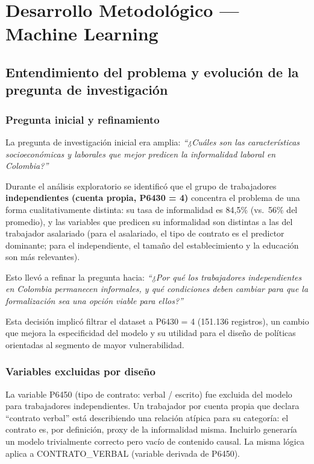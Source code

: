 \documentclass[12pt, a4paper]{article}
\begin{document}
\section{Desarrollo Metodológico — Machine Learning}
\label{sec:ml}

\subsection{Entendimiento del problema y evolución de la pregunta de investigación}

\subsubsection{Pregunta inicial y refinamiento}

La pregunta de investigación inicial era amplia:
\textit{``¿Cuáles son las características socioeconómicas y laborales que mejor predicen la
informalidad laboral en Colombia?''}

Durante el análisis exploratorio se identificó que el grupo de trabajadores
\textbf{independientes (cuenta propia, P6430 = 4)} concentra el problema de una forma
cualitativamente distinta: su tasa de informalidad es 84{,}5\% (vs.\ 56\% del promedio),
y las variables que predicen su informalidad son distintas a las del trabajador asalariado
(para el asalariado, el tipo de contrato es el predictor dominante; para el independiente,
el tamaño del establecimiento y la educación son más relevantes).

Esto llevó a refinar la pregunta hacia:
\textit{``¿Por qué los trabajadores independientes en Colombia permanecen informales,
y qué condiciones deben cambiar para que la formalización sea una opción viable para ellos?''}

Esta decisión implicó filtrar el dataset a P6430 = 4 (151.136 registros), un cambio
que mejora la especificidad del modelo y su utilidad para el diseño de políticas
orientadas al segmento de mayor vulnerabilidad.

\subsubsection{Variables excluidas por diseño}

\begin{decision}
La variable P6450 (tipo de contrato: verbal / escrito) fue excluida del modelo
para trabajadores independientes. Un trabajador por cuenta propia que declara
``contrato verbal'' está describiendo una relación atípica para su categoría:
el contrato es, por definición, proxy de la informalidad misma. Incluirlo
generaría un modelo trivialmente correcto pero vacío de contenido causal.
La misma lógica aplica a CONTRATO\_VERBAL (variable derivada de P6450).
\end{decision}
\end{document}
